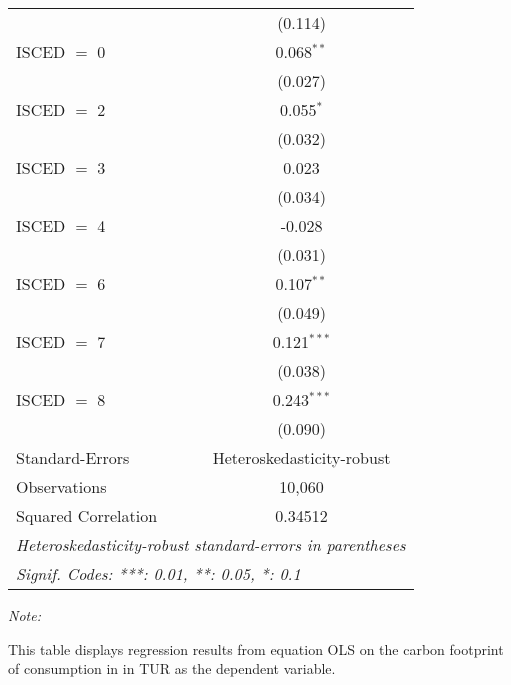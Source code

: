 \begin{table}[htbp!]
\begin{adjustbox}{width = 1\textwidth, max height = 0.95\textheight, center}
\begin{threeparttable}[b]
\begin{tabular}{lc}
                                & (0.114)\\   
            ISCED $=$ 0         & 0.068$^{**}$\\   
                                & (0.027)\\   
            ISCED $=$ 2         & 0.055$^{*}$\\   
                                & (0.032)\\   
            ISCED $=$ 3         & 0.023\\   
                                & (0.034)\\   
            ISCED $=$ 4         & -0.028\\   
                                & (0.031)\\   
            ISCED $=$ 6         & 0.107$^{**}$\\   
                                & (0.049)\\   
            ISCED $=$ 7         & 0.121$^{***}$\\   
                                & (0.038)\\   
            ISCED $=$ 8         & 0.243$^{***}$\\   
                                & (0.090)\\   
            \midrule 
            Standard-Errors     & Heteroskedasticity-robust \\   
            Observations        & 10,060\\  
            Squared Correlation & 0.34512\\  
            \midrule \midrule
            \multicolumn{2}{l}{\emph{Heteroskedasticity-robust standard-errors in parentheses}}\\
            \multicolumn{2}{l}{\emph{Signif. Codes: ***: 0.01, **: 0.05, *: 0.1}}\\
         \end{tabular}
         
         \begin{tablenotes}\item \medskip \textit{Note:}
            \item This table displays regression results from equation OLS on the carbon footprint of consumption in  in TUR as the dependent variable.  
         \end{tablenotes}
      \end{threeparttable}
   \end{adjustbox}
\end{table}


